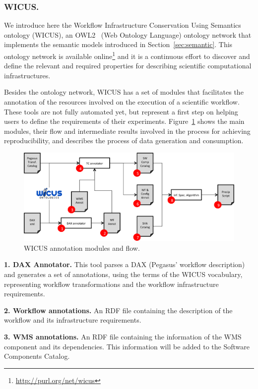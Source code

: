 \documentclass[final,5p,times,twocolumn]{elsarticle}
\begin{document}
\subsubsection{WICUS.}
We introduce here the Workflow Infrastructure Conservation Using Semantics ontology (WICUS), an OWL2~\cite{OWL2} (Web Ontology Language) ontology network that implements the semantic models introduced in Section~\ref{sec:semantic}. This ontology network is available online\footnote{\url{http://purl.org/net/wicus}} and it is a continuous effort to discover and define the relevant and required properties for describing scientific computational infrastructures. 

Besides the ontology network, WICUS has a set of modules that facilitates the annotation of the resources involved on the execution of a scientific workflow. These tools are not fully automated yet, but represent a first step on helping users to define the requirements of their experiments. Figure~\ref{fig:wicusflow} shows the main modules, their flow and intermediate results involved in the process for achieving reproducibility, and describes the process of data generation and consumption.

\begin{figure}[!htb]
	\centering
	\includegraphics[width=\linewidth]{figures/wicusflow}
	\caption{WICUS annotation modules and flow.}
	\label{fig:wicusflow}
\end{figure}

\noindent \textbf{1. DAX Annotator.} This tool parses a DAX (Pegasus' workflow description) and generates a set of annotations, using the terms of the WICUS vocabulary, representing workflow transformations and the workflow infrastructure requirements.

\noindent \textbf{2. Workflow annotations.} An RDF file containing the description of the workflow and its infrastructure requirements.

\noindent \textbf{3. WMS annotations.} An RDF file containing the information of the WMS component and its dependencies. This information will be added to the Software Components Catalog.
\end{document}
